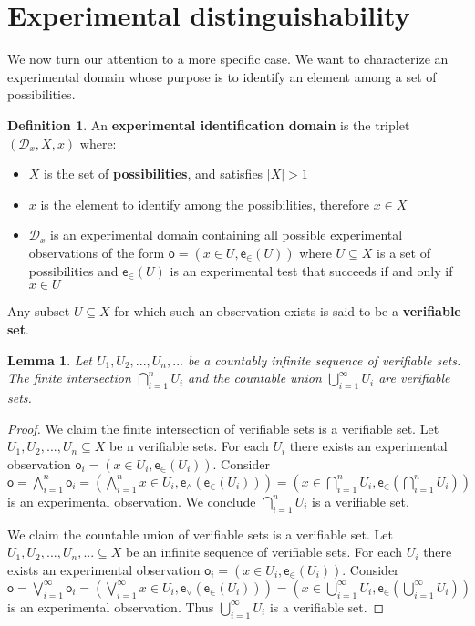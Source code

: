 \documentclass[review]{elsarticle}
\theoremstyle{plain}%
\newtheorem{lem}[thm]{Lemma}
\theoremstyle{definition}
\newtheorem{defn}{Definition}[section]
\theoremstyle{remark}
\begin{document}
\section{Experimental distinguishability}

We now turn our attention to a more specific case. We want to characterize an experimental domain whose purpose is to identify an element among a set of possibilities.

\begin{defn}
	An \textbf{experimental identification domain} is the triplet $(\mathcal{D}_x, X, x)$ where:
	\begin{itemize}
		\item $X$ is the set of \textbf{possibilities}, and satisfies $|X|>1$
		\item $x$ is the element to identify among the possibilities, therefore $x \in X$
		\item $\mathcal{D}_x$ is an experimental domain containing all possible experimental observations of the form $\mathsf{o} = (x\in U, \mathsf{e}_\in(U))$ where $U \subseteq X$ is a set of possibilities and $\mathsf{e}_\in(U)$ is an experimental test that succeeds if and only if $x \in U$
	\end{itemize}
	Any subset $U\subseteq X$ for which such an observation exists is said to be a \textbf{verifiable set}.
\end{defn}

\begin{lem}
\label{setbehavior}
	Let $U_1, U_2, ... , U_n, ...$ be a countably infinite sequence of verifiable sets. The finite intersection $\bigcap\limits_{i=1}^{n} U_i$ and the countable union $\bigcup\limits_{i=1}^{\infty} U_i$ are verifiable sets.
\end{lem}

\begin{proof}
	We claim the finite intersection of verifiable sets is a verifiable set. Let $U_1, U_2, ... , U_n \subseteq X$ be n verifiable sets. For each $U_i$ there exists an experimental observation $\mathsf{o}_i = (x\in U_i, \mathsf{e}_\in(U_i))$. Consider $\mathsf{o} = \bigwedge\limits_{i=1}^{n} \mathsf{o}_i = (\bigwedge\limits_{i=1}^{n} x\in U_i , \mathsf{e}_{\wedge}(\mathsf{e}_\in(U_i)))=( x\in \bigcap\limits_{i=1}^{n} U_i, \mathsf{e}_\in(\bigcap\limits_{i=1}^{n} U_i))$ is an experimental observation. We conclude $\bigcap\limits_{i=1}^{n} U_i$ is a verifiable set.
	
	We claim the countable union of verifiable sets is a verifiable set. Let $U_1, U_2, ... , U_n, ... \subseteq X$ be an infinite sequence of verifiable sets. For each $U_i$ there exists an experimental observation $\mathsf{o}_i = (x\in U_i, \mathsf{e}_\in(U_i))$. Consider $\mathsf{o} = \bigvee\limits_{i=1}^{\infty} \mathsf{o}_i = (\bigvee\limits_{i=1}^{\infty} x\in U_i, \mathsf{e}_{\vee}(\mathsf{e}_\in(U_i)))=( x\in \bigcup\limits_{i=1}^{\infty} U_i, \mathsf{e}_\in(\bigcup\limits_{i=1}^{\infty} U_i))$ is an experimental observation. Thus $\bigcup\limits_{i=1}^{\infty} U_i$ is a verifiable set.
\end{proof}
\end{document}
